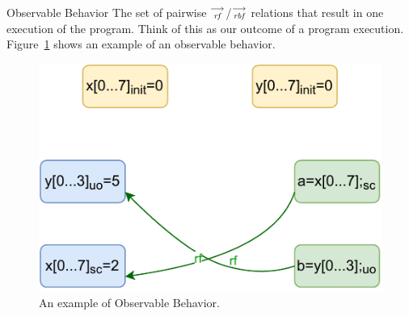     \begin{definition}{Observable Behavior}
        The set of pairwise $\stackrel{\longrightarrow}{_\textit{rf}}$/$\stackrel{\longrightarrow}{_\textit{rbf}}$ relations that result in one execution of the program. 
        Think of this as our outcome of a program execution.
        Figure~\ref{model:observable} shows an example of an observable behavior.
        \begin{figure}[H]
            \centering
            \includegraphics[scale=0.7]{4.ECMAScriptMemoryModel/Observables.pdf}
            \caption{An example of Observable Behavior.}
            \label{model:observable}
        \end{figure}
        
    \end{definition}

    